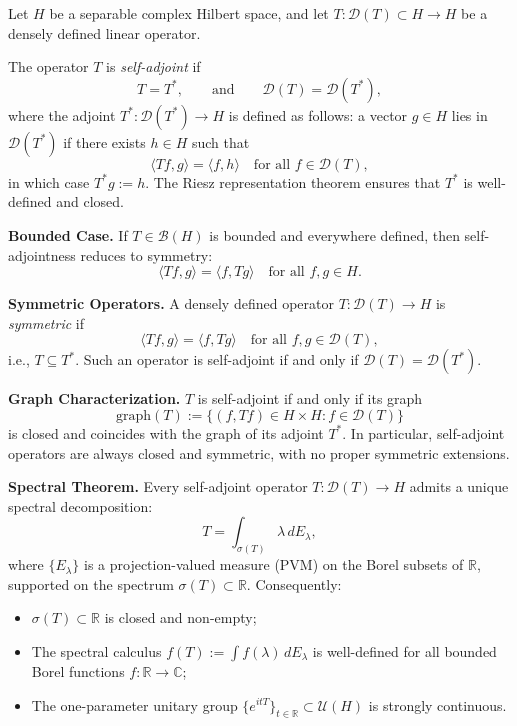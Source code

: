 \begin{definition}\label{def:selfadjoint-operator}
Let \( H \) be a separable complex Hilbert space, and let \( T \colon \mathcal{D}(T) \subset H \to H \) be a densely defined linear operator.

The operator \( T \) is \emph{self-adjoint} if
\[
T = T^*, \qquad \text{and} \qquad \mathcal{D}(T) = \mathcal{D}(T^*),
\]
where the adjoint \( T^* \colon \mathcal{D}(T^*) \to H \) is defined as follows: a vector \( g \in H \) lies in \( \mathcal{D}(T^*) \) if there exists \( h \in H \) such that
\[
\langle T f, g \rangle = \langle f, h \rangle \quad \text{for all } f \in \mathcal{D}(T),
\]
in which case \( T^* g := h \). The Riesz representation theorem ensures that \( T^* \) is well-defined and closed.

\medskip
\noindent\textbf{Bounded Case.}
If \( T \in \mathcal{B}(H) \) is bounded and everywhere defined, then self-adjointness reduces to symmetry:
\[
\langle T f, g \rangle = \langle f, T g \rangle \quad \text{for all } f, g \in H.
\]

\medskip
\noindent\textbf{Symmetric Operators.}
A densely defined operator \( T \colon \mathcal{D}(T) \to H \) is \emph{symmetric} if
\[
\langle T f, g \rangle = \langle f, T g \rangle \quad \text{for all } f, g \in \mathcal{D}(T),
\]
i.e., \( T \subseteq T^* \). Such an operator is self-adjoint if and only if \( \mathcal{D}(T) = \mathcal{D}(T^*) \).

\medskip
\noindent\textbf{Graph Characterization.}
\( T \) is self-adjoint if and only if its graph
\[
\mathrm{graph}(T) := \{ (f, Tf) \in H \times H : f \in \mathcal{D}(T) \}
\]
is closed and coincides with the graph of its adjoint \( T^* \). In particular, self-adjoint operators are always closed and symmetric, with no proper symmetric extensions.

\medskip
\noindent\textbf{Spectral Theorem.}
Every self-adjoint operator \( T \colon \mathcal{D}(T) \to H \) admits a unique spectral decomposition:
\[
T = \int_{\sigma(T)} \lambda \, dE_\lambda,
\]
where \( \{ E_\lambda \} \) is a projection-valued measure (PVM) on the Borel subsets of \( \mathbb{R} \), supported on the spectrum \( \sigma(T) \subset \mathbb{R} \). Consequently:
\begin{itemize}
    \item \( \sigma(T) \subset \mathbb{R} \) is closed and non-empty;
    \item The spectral calculus \( f(T) := \int f(\lambda)\, dE_\lambda \) is well-defined for all bounded Borel functions \( f \colon \mathbb{R} \to \mathbb{C} \);
    \item The one-parameter unitary group \( \{ e^{itT} \}_{t \in \mathbb{R}} \subset \mathcal{U}(H) \) is strongly continuous.
\end{itemize}


\end{definition}
